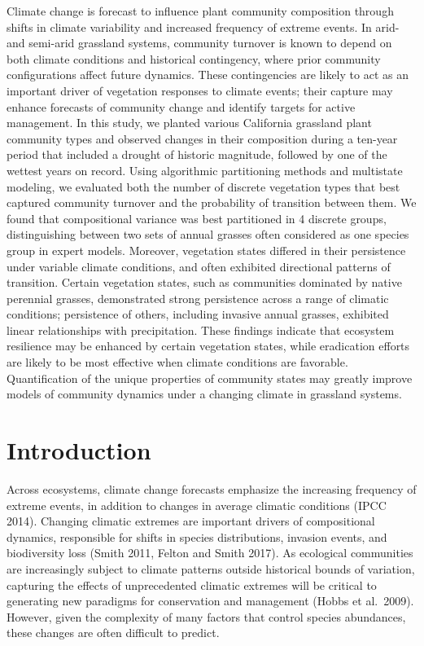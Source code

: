 \documentclass[twoside,12pt,final]{ucthesis-CA2012}
\begin{document}
\begin{ucmainmatter}
Climate change is forecast to influence plant community composition through shifts in climate variability and increased frequency of extreme events.
In arid- and semi-arid grassland systems, community turnover is known to depend on both climate conditions and historical contingency, where prior community configurations affect future dynamics.
These contingencies are likely to act as an important driver of vegetation responses to climate events; their capture may enhance forecasts of community change and identify targets for active management.
In this study, we planted various California grassland plant community types and observed changes in their composition during a ten-year period that included a drought of historic magnitude, followed by one of the wettest years on record. Using algorithmic partitioning methods and multistate modeling, we evaluated both the number of discrete vegetation types that best captured community turnover and the probability of transition between them.
We found that compositional variance was best partitioned in 4 discrete groups, distinguishing between two sets of annual grasses often considered as one species group in expert models.
Moreover, vegetation states differed in their persistence under variable climate conditions, and often exhibited directional patterns of transition.
Certain vegetation states, such as communities dominated by native perennial grasses, demonstrated strong persistence across a range of climatic conditions;
persistence of others, including invasive annual grasses, exhibited linear relationships with precipitation.
These findings indicate that ecosystem resilience may be enhanced by certain vegetation states, while eradication efforts are likely to be most effective when climate conditions are favorable.
Quantification of the unique properties of community states may greatly improve models of community dynamics under a changing climate in grassland systems.

\hypertarget{introduction}{%
\section{Introduction}\label{introduction}}

Across ecosystems, climate change forecasts emphasize the increasing frequency of extreme events, in addition to changes in average climatic conditions (IPCC 2014).
Changing climatic extremes are important drivers of compositional dynamics, responsible for shifts in species distributions, invasion events, and biodiversity loss (Smith 2011, Felton and Smith 2017).
As ecological communities are increasingly subject to climate patterns outside historical bounds of variation, capturing the effects of unprecedented climatic extremes will be critical to generating new paradigms for conservation and management (Hobbs et al.~2009).
However, given the complexity of many factors that control species abundances, these changes are often difficult to predict.


\end{ucmainmatter}
\end{document}
